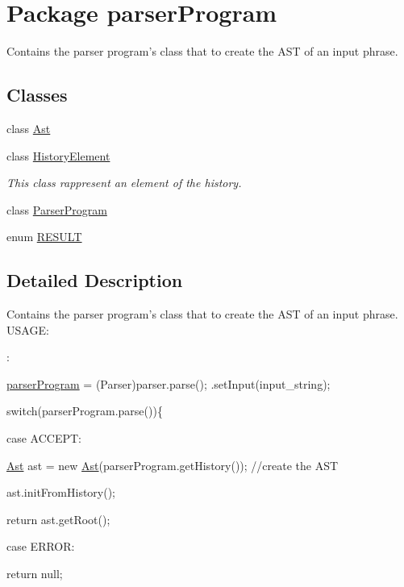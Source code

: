 \hypertarget{namespaceparser_program}{\section{Package parser\-Program}
\label{namespaceparser_program}
}


Contains the parser program's class that to create the A\-S\-T of an input phrase.  


\subsection*{Classes}
\begin{DoxyCompactItemize}
\item 
class \hyperlink{classparser_program_1_1_ast}{Ast}
\item 
class \hyperlink{classparser_program_1_1_history_element}{History\-Element}
\begin{DoxyCompactList}\small\item\em This class rappresent an element of the history. \end{DoxyCompactList}\item 
class \hyperlink{classparser_program_1_1_parser_program}{Parser\-Program}
\item 
enum \hyperlink{enumparser_program_1_1_r_e_s_u_l_t}{R\-E\-S\-U\-L\-T}
\end{DoxyCompactItemize}


\subsection{Detailed Description}
Contains the parser program's class that to create the A\-S\-T of an input phrase. U\-S\-A\-G\-E\-:\par
 \-:\par
  \hyperlink{namespaceparser_program}{parser\-Program} = (Parser)parser.\-parse(); .set\-Input(input\-\_\-string); \par
 switch(parser\-Program.\-parse())\{ \par
 case A\-C\-C\-E\-P\-T\-: \par
 \hyperlink{classparser_program_1_1_ast}{Ast} ast = new \hyperlink{classparser_program_1_1_ast}{Ast}(parser\-Program.\-get\-History()); //create the A\-S\-T \par
 ast.\-init\-From\-History(); \par
 return ast.\-get\-Root(); \par
 case E\-R\-R\-O\-R\-: \par
 return null; 